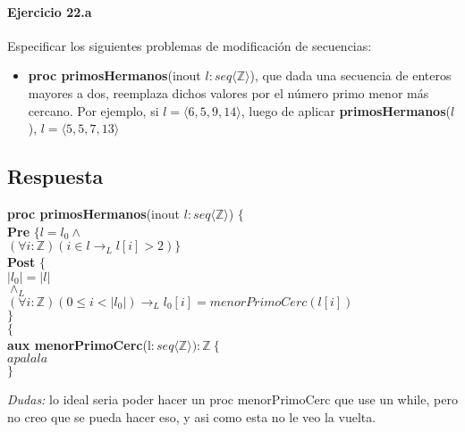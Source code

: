 \documentclass[a4paper]{article}
\begin{document}
\paragraph*{Ejercicio 22.a} Especificar los siguientes problemas de modificación de secuencias:
	\begin{itemize}
		\item \textbf{proc primosHermanos}(inout $l:seq\langle \mathbb{Z}\rangle$), que dada una secuencia de enteros mayores a dos, reemplaza dichos valores por el número primo menor más cercano. Por ejemplo, si $l=\langle 6,5,9,14 \rangle$, luego de aplicar \textbf{primosHermanos}($l$), $l=\langle 5,5,7,13 \rangle$
	\end{itemize}
	
\subsection*{Respuesta}
			
			\textbf{proc primosHermanos}(inout $l:seq\langle \mathbb{Z}\rangle$) $\{$\smallskip \\
			\hspace*{6mm} \textbf{Pre }$\{l=l_0 \wedge$\\
			\hspace*{6mm} $(\forall i:\mathbb{Z})(i\in l \rightarrow_L
			 l[i]>2)\}$\smallskip \\
			\hspace*{6mm} \textbf{Post }$\{$\\
			\hspace*{6mm} $|l_0|=|l|$\\
			\hspace*{6mm} $\wedge_L$\\
			\hspace*{6mm} $(\forall i:\mathbb{Z})(0\leq i < |l_0|)\rightarrow_L 
				l_0[i]=menorPrimoCerc(l[i])$\\
			\hspace*{6mm} $\}$\\
			$\{$\smallskip \\
			
			\textbf{aux menorPrimoCerc}(l$: seq\langle \mathbb{Z}\rangle):\mathbb{Z}
			\ \{$\smallskip \\
			\hspace*{6mm}$apalala$\\
			$\}$

\textit{Dudas:} lo ideal seria poder hacer un proc menorPrimoCerc que use un while, pero no creo
que se pueda hacer eso, y asi como esta no le veo la vuelta.
\end{document}
